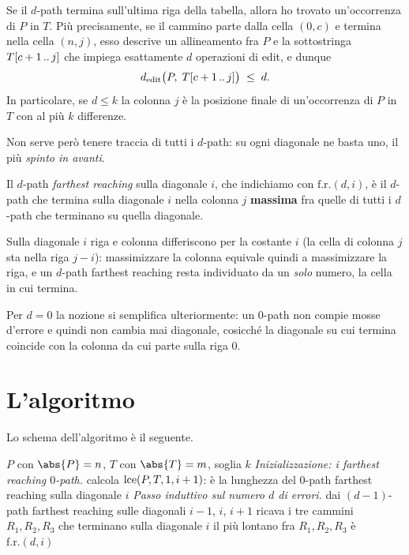 \begin{osservazione}
  Se il $d$-path termina sull'ultima riga della tabella, allora ho trovato
  un'occorrenza di $P$ in $T$. Più precisamente, se il cammino parte dalla cella
  $(0,c)$ e termina nella cella $(n,j)$, esso descrive un allineamento fra $P$ e
  la sottostringa $T[c+1\,..\,j]$ che impiega esattamente $d$ operazioni di
  edit, e dunque
  \[
    d_{\mathrm{edit}}\bigl(P,\;T[c+1\,..\,j]\bigr) \;\le\; d .
  \]
  In particolare, se $d\le k$ la colonna $j$ è la posizione finale di
  un'occorrenza di $P$ in $T$ con al più $k$ differenze.
\end{osservazione}

Non serve però tenere traccia di tutti i $d$-path: su ogni diagonale ne basta
uno, il più \emph{spinto in avanti}.

\begin{definizione}
\label{def:fr-dpath}
  Il $d$-path \emph{farthest reaching} sulla diagonale $i$, che indichiamo con
  $\mathrm{f.r.}(d,i)$, è il $d$-path che termina sulla diagonale $i$ nella
  colonna $j$ \textbf{massima} fra quelle di tutti i $d$-path che terminano su
  quella diagonale.
\end{definizione}

\begin{osservazione}
  Sulla diagonale $i$ riga e colonna differiscono per la costante $i$ (la cella
  di colonna $j$ sta nella riga $j-i$): massimizzare la colonna equivale quindi
  a massimizzare la riga, e un $d$-path farthest reaching resta individuato da
  un \emph{solo} numero, la cella in cui termina.

  Per $d=0$ la nozione si semplifica ulteriormente: un $0$-path non compie mosse
  d'errore e quindi non cambia mai diagonale, cosicché la diagonale su cui
  termina coincide con la colonna da cui parte sulla riga $0$.
\end{osservazione}

\section{L'algoritmo}

Lo schema dell'algoritmo è il seguente.

\begin{algorithm}[H]
\caption{Landau--Vishkin: matching con al più $k$ differenze}
\begin{algorithmic}[1]
\Require $P$ con $\abs{P}=n$, $T$ con $\abs{T}=m$, soglia $k$
\Statex \textit{Inizializzazione: i farthest reaching $0$-path.}
  \State calcola $\operatorname{lce}(P,T,1,i+1)$: è la lunghezza del $0$-path farthest
         reaching sulla diagonale $i$ 
\EndFor
\Statex \textit{Passo induttivo sul numero $d$ di errori.}
    \State dai $(d-1)$-path farthest reaching sulle diagonali $i-1$, $i$, $i+1$
           ricava i tre cammini $R_1,R_2,R_3$ che terminano sulla diagonale $i$
    \State il più lontano fra $R_1,R_2,R_3$ è $\mathrm{f.r.}(d,i)$
  \EndFor
\EndFor
\end{algorithmic}
\end{algorithm}

